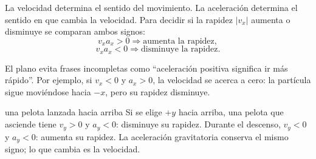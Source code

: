 \documentclass[11pt]{article}
\begin{document}
La velocidad determina el sentido del movimiento. La aceleración determina el
sentido en que cambia la velocidad. Para decidir si la rapidez
\(|v_x|\) aumenta o disminuye se comparan ambos signos:
\[
  v_xa_x>0
  \Longrightarrow
  \text{aumenta la rapidez},
\]
\[
  v_xa_x<0
  \Longrightarrow
  \text{disminuye la rapidez}.
\]

\begin{center}
\end{center}

El plano evita frases incompletas como ``aceleración positiva significa ir más
rápido''. Por ejemplo, si \(v_x<0\) y \(a_x>0\), la velocidad se acerca a cero:
la partícula sigue moviéndose hacia \(-x\), pero su rapidez disminuye.

\begin{ejemplocualitativo}{una pelota lanzada hacia arriba}
Si se elige \(+y\) hacia arriba, una pelota que asciende tiene \(v_y>0\) y
\(a_y<0\): disminuye su rapidez. Durante el descenso,
\(v_y<0\) y \(a_y<0\): aumenta su rapidez. La aceleración gravitatoria conserva
el mismo signo; lo que cambia es la velocidad.
\end{ejemplocualitativo}
\end{document}
